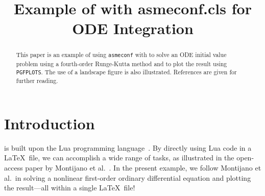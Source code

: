 \documentclass[nofontspec,grid,colorlinks,nofoot]{asmeconf}
\begin{document}

\title{Example of  with asmeconf.cls for ODE Integration}
 

\maketitle



\begin{abstract}
This paper is an example of using {\upshape\texttt{asmeconf}} with {\upshape{}} to solve an ODE initial value problem using a fourth-order Runge-Kutta method and to plot the result using {\upshape\texttt{PGFPLOTS}}. The use of a landscape figure is also illustrated. References are given for further reading.
\end{abstract}


\begin{nomenclature}
\end{nomenclature}


\section{Introduction}
 is built upon the Lua programming language~\cite{lua}. By directly using Lua code in a \LaTeX\ file, we can accomplish a wide range of tasks, as illustrated in the open-access paper by Montijano et al.~\cite{montijano2014}.  In the present example, we follow Montijano et al.\ in solving a nonlinear first-order ordinary differential equation and plotting the result---all within a single \LaTeX\ file!
\end{document}
